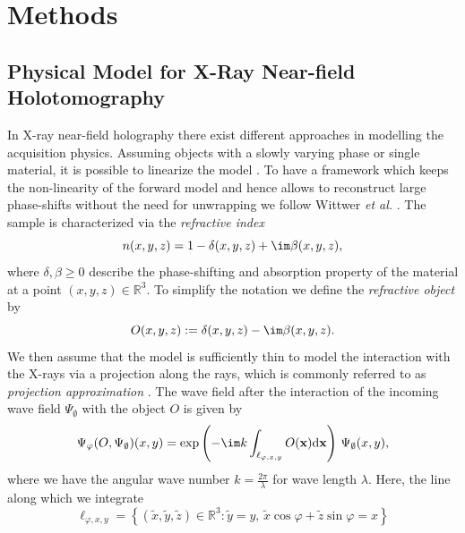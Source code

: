 \section{Methods}  \label{sec:Methods}

\subsection{Physical Model for X-Ray Near-field Holotomography} \label{subsec:physics}
In X-ray near-field holography there exist different approaches in modelling the acquisition physics.
Assuming objects with a slowly varying phase or single material, it is possible to linearize the model \cite{zablerOptimizationPhaseContrast2005}.
To have a framework which keeps the non-linearity of the forward model and hence allows to reconstruct large phase-shifts without the need for unwrapping we follow Wittwer \textit{et al.} \cite{wittwerPhaseRetrievalFramework2022}.
The sample is characterized via the \textit{refractive index}
\begin{equation}
  n(x,y,z) = 1 - \delta(x,y,z) + \im \beta(x,y,z),
  \label{eq:refr_idx}
\end{equation}
where $\delta, \beta \ge 0$ describe the phase-shifting and absorption property of the material at a point $(x,y,z) \in \mathbb{R}^3$.
To simplify the notation we define the \textit{refractive object} by
\begin{equation}
  O(x,y,z) := \delta(x,y,z)  - \im \beta(x,y,z).  
\label{eq:refr_obj}
\end{equation}
We then assume that the model is sufficiently thin to model the interaction with the X-rays via a projection along the rays, which is commonly referred to as \textit{projection
approximation} \cite[ch.~2.2]{paganinCoherentXrayOptics2006}.
The wave field after the interaction of the incoming wave field \(  \Psi_\emptyset \) with the object \( O \) is given by
\begin{equation}
  \Psi_\varphi (O, \Psi_\emptyset)(x,y) = \exp \left( -\im k \int_{\ell_{\varphi,x,y}}
  O(\textbf{x})
\mathrm{d}\mathbf{x} \right)   \, \Psi_\emptyset(x,y),
\label{eq:exit_wave}
\end{equation}
where we have the angular wave number \( k=\frac{2\pi}{\lambda} \) for wave length \(  \lambda. \)
Here, the line along which we integrate
\begin{equation}
  \ell_{\varphi,x,y} = \left\{  (\tilde{x},\tilde{y},\tilde{z}) \in \mathbb{R}^3: \tilde{y}=y,
    \,  \tilde{x} \cos\varphi + \tilde{z} \sin\varphi = x \right\}
\label{eq:ray_line}
\end{equation}
